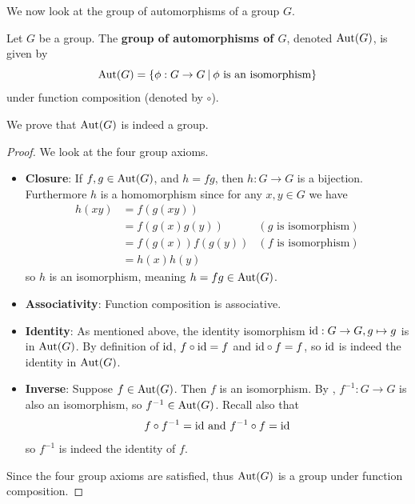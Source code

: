 We now look at the group of automorphisms of a group $G$.
\begin{definition}
    Let $G$ be a group. The \textbf{group of automorphisms of $G$}, denoted $\mathrm{Aut}(G)$, is given by
    \[
        \Aut{G} = \{\phi: G \to G \vert \phi \text{ is an isomorphism}\}
    \]
    under function composition (denoted by $\circ$).
\end{definition}
We prove that $\mathrm{Aut}(G)$ is indeed a group.

\newpage

\begin{proof}
    We look at the four group axioms.
    \begin{itemize}
        \item \textbf{Closure}: If $f, g \in \mathrm{Aut}(G)$, and $h = fg$, then $h: G \to G$ is a bijection. Furthermore $h$ is a homomorphism since for any $x, y \in G$ we have
        \begin{align*}
            h(xy) &= f(g(xy))\\
            &= f(g(x)g(y)) & (g \text{ is isomorphism})\\
            &= f(g(x))f(g(y)) & (f \text{ is isomorphism})\\
            &= h(x)h(y)
        \end{align*}
        so $h$ is an isomorphism, meaning $h = fg \in \mathrm{Aut}(G)$.

        \item \textbf{Associativity}: Function composition is associative.

        \item \textbf{Identity}: As mentioned above, the identity isomorphism $\mathrm{id}: G \to G, g \mapsto g$ is in $\mathrm{Aut}(G)$. By definition of $\mathrm{id}$, $f \circ \mathrm{id} = f$ and $\mathrm{id} \circ f = f$, so $\mathrm{id}$ is indeed the identity in $\mathrm{Aut}(G)$.

        \item \textbf{Inverse}: Suppose $f \in \mathrm{Aut}(G)$. Then $f$ is an isomorphism. By , $f^{-1}: G \to G$ is also an isomorphism, so $f^{-1} \in \mathrm{Aut}(G)$. Recall also that
        \[
            f\circ f^{-1} = \mathrm{id} \text{ and } f^{-1}\circ f = \mathrm{id}
        \]
        so $f^{-1}$ is indeed the identity of $f$.
    \end{itemize}
    Since the four group axioms are satisfied, thus $\mathrm{Aut}(G)$ is a group under function composition.
\end{proof}

\newpage

